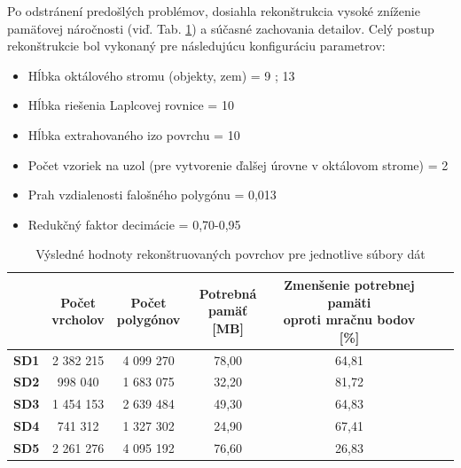 \indent Po odstránení predošlých problémov, dosiahla rekonštrukcia vysoké zníženie pamäťovej náročnosti (viď. Tab. \ref{table:mesh_results}) a súčasné zachovania detailov. Celý postup rekonštrukcie bol vykonaný pre následujúcu konfiguráciu parametrov:

\begin{itemize}
  \setlength\itemsep{0.2em}
  \item Hĺbka oktálového stromu (objekty, zem) = 9 ; 13
  \item Hĺbka riešenia Laplcovej rovnice = 10
  \item Hĺbka extrahovaného izo povrchu = 10
  \item Počet vzoriek na uzol (pre vytvorenie ďalšej úrovne v oktálovom strome) = 2
  \item Prah vzdialenosti falošného polygónu = 0,013
  \item Redukčný faktor decimácie = 0,70-0,95
\end{itemize}

\begin{table} [!h]
  \begin{center} %
      \begin{tabular}{|c || c | c | c | c | c| c|} 
       \hline
        & \thead{Počet \\ vrcholov} &
          \thead{Počet \\ polygónov} &
          \thead{Potrebná \\ pamäť [MB]} &
          \thead{Zmenšenie potrebnej pamäti \\ oproti mračnu bodov [\%]} \\ [0.5ex]    
       \hline\hline
       \textbf{SD1} & 2 382 215  & 4 099 270 & 78,00 & 64,81 \\ 
       \hline
       \textbf{SD2} & 998 040  & 1 683 075 & 32,20 & 81,72 \\
       \hline
       \textbf{SD3} &  1 454 153  & 2 639 484 & 49,30 & 64,83 \\
       \hline
       \textbf{SD4} & 741 312  & 1 327 302 & 24,90 & 67,41 \\
       \hline
       \textbf{SD5} & 2 261 276  & 4 095 192 & 76,60 & 26,83 \\ 
       \hline
      \end{tabular}
  \caption{Výsledné hodnoty rekonštruovaných povrchov pre jednotlive súbory dát}
  \label{table:mesh_results}
  \end{center}
\end{table}


